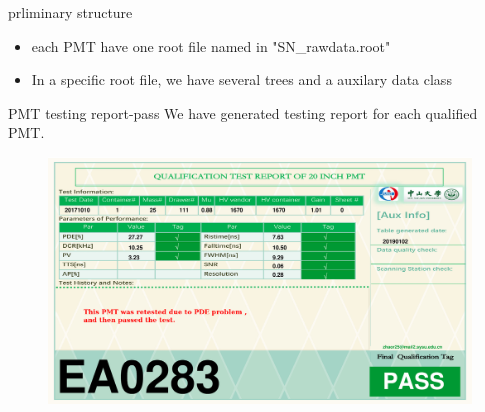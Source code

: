 \begin{frame}{prliminary structure}
\begin{itemize}
\item each PMT have one root file named in "SN\_rawdata.root"
\item In a specific root file, we have several trees and a auxilary data class
\end{itemize}

\end{frame}
\begin{frame}{PMT testing report-pass}
We have generated testing report for each qualified PMT.
\vspace{-.2cm}
\begin{figure}
\centering
\includegraphics[width=1.0\textwidth]{figures/SN_EA0283_pde1_dcr1_HV1_pv1_rt1_tag1.png}
\end{figure}
\end{frame}
%
%
